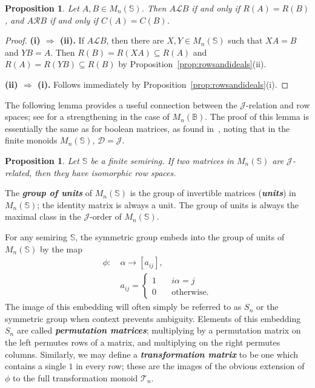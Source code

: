 \documentclass[11pt]{article}
\newtheorem{prop}[thm]{Proposition}
\newcommand{\defn}[1]{\textbf{\textit{#1}}}
\numberwithin{equation}{section}
\renewcommand{\to}{\longrightarrow}
\newcommand{\B}{\mathbb{B}}
\newcommand{\Bn}{M_n(\B)}
\renewcommand{\L}{\mathscr{L}}
\newcommand{\R}{\mathscr{R}}
\newcommand{\D}{\mathscr{D}}
\newcommand{\J}{\mathscr{J}}
\begin{document}
\begin{prop} 
  Let $A, B \in M_n(\mathbb{S})$. Then $A \L B$ if and only if $R(A) = R(B)$,
  and $A \R B$ if and only if $C(A) = C(B)$. 
\end{prop}
\begin{proof}
  \textbf{(i) $\Rightarrow$ (ii).} 
  If $A \L B$, then there are $X, Y \in M_n(\mathbb{S})$ such that $XA = B$ and
  $YB = A$. Then $R(B) = R(XA) \subseteq R(A)$ and $R(A) = R(YB) \subseteq R(B)$
  by Proposition~\ref{prop:rowsandideals}(ii).
  \bigskip

  \textbf{(ii) $\Rightarrow$ (i).} Follows immediately by
  Proposition~\ref{prop:rowsandideals}(i). 
\end{proof}

The following lemma provides a useful connection between the $\J$-relation and row
spaces; see  for a strengthening in the case of $\Bn$.
The proof of this lemma is essentially the same as for boolean matrices,
as found in~\cite[Theorem 1.3.3, forward direction]{Kim1982aa}, noting that in
the finite monoids $M_{n}(\mathbb{S})$, $\D = \J$.
\begin{prop}
  Let $\mathbb{S}$ be a finite semiring. If two matrices in
  $M_{n}(\mathbb{S})$ are $\J$-related, then they have isomorphic row spaces.
\end{prop}

The \defn{group of units} of $M_n(\mathbb{S})$ is the group of invertible
matrices (\defn{units}) in $M_n(\mathbb{S})$; the identity matrix is always a
unit. The group of units is always the maximal class in the $\J$-order of
$M_n(\mathbb{S})$.

For any semiring $\mathbb{S}$, the symmetric group embeds into the group of units of
$M_n(\mathbb{S})$ by the map 
\begin{align*}
  \phi:\: &\alpha \to [a_{ij}], \\
  &a_{ij} =
    \begin{cases}
      1 \quad & i\alpha = j \\ 
      0 \quad &\text{otherwise}.
    \end{cases}
\end{align*}
The image of this embedding will often simply be referred to as $S_n$ or the
symmetric group when context prevents ambiguity. Elements of this embedding
$S_n$ are called \defn{permutation matrices}; multiplying by a permutation
matrix on the left permutes rows of a matrix, and multiplying on the right
permutes columns. Similarly, we may define a \defn{transformation matrix} to be
one which contains a single $1$ in every row; these are the images of the
obvious extension of $\phi$ to the full transformation monoid $\mathcal{T}_n$.
\end{document}
